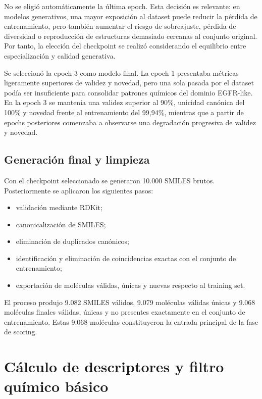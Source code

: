 \documentclass[IB]{TFUOC}%
\begin{document}
No se eligió automáticamente la última epoch. Esta decisión es relevante: en modelos generativos, una mayor exposición al dataset puede reducir la pérdida de entrenamiento, pero también aumentar el riesgo de sobreajuste, pérdida de diversidad o reproducción de estructuras demasiado cercanas al conjunto original. Por tanto, la elección del checkpoint se realizó considerando el equilibrio entre especialización y calidad generativa.

Se seleccionó la epoch 3 como modelo final. La epoch 1 presentaba métricas ligeramente superiores de validez y novedad, pero una sola pasada por el dataset podía ser insuficiente para consolidar patrones químicos del dominio EGFR-like. En la epoch 3 se mantenía una validez superior al 90\%, unicidad canónica del 100\% y novedad frente al entrenamiento del 99,94\%, mientras que a partir de epochs posteriores comenzaba a observarse una degradación progresiva de validez y novedad.

\subsection{Generación final y limpieza}

Con el checkpoint seleccionado se generaron 10.000 SMILES brutos. Posteriormente se aplicaron los siguientes pasos:

\begin{itemize}
    \item validación mediante RDKit;
    \item canonicalización de SMILES;
    \item eliminación de duplicados canónicos;
    \item identificación y eliminación de coincidencias exactas con el conjunto de entrenamiento;
    \item exportación de moléculas válidas, únicas y nuevas respecto al training set.
\end{itemize}

El proceso produjo 9.082 SMILES válidos, 9.079 moléculas válidas únicas y 9.068 moléculas finales válidas, únicas y no presentes exactamente en el conjunto de entrenamiento. Estas 9.068 moléculas constituyeron la entrada principal de la fase de scoring.

\section{Cálculo de descriptores y filtro químico básico}
\end{document}
